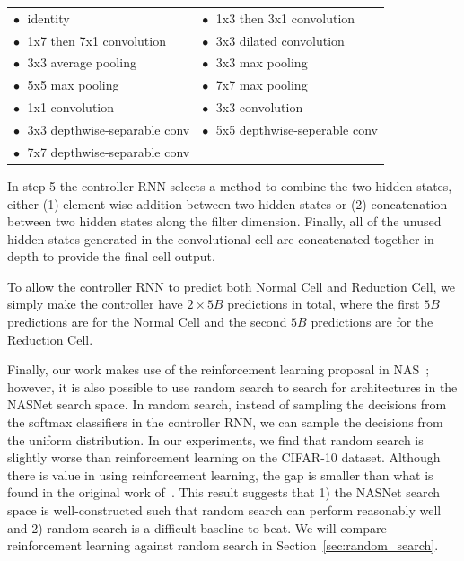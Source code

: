 \begin{table}[H]
\footnotesize
\setlength{\tabcolsep}{0.5em} %
\centering
\def\arraystretch{1.0}
\begin{tabular}{ll}
$\bullet\;$ identity & $\bullet\;$ 1x3 then 3x1 convolution \\
$\bullet\;$ 1x7 then 7x1 convolution & $\bullet\;$ 3x3 dilated convolution \\
$\bullet\;$ 3x3 average pooling & $\bullet\;$ 3x3 max pooling \\
$\bullet\;$ 5x5 max pooling & $\bullet\;$ 7x7 max pooling \\
$\bullet\;$ 1x1 convolution & $\bullet\;$ 3x3 convolution \\
$\bullet\;$ 3x3 depthwise-separable conv & $\bullet\;$ 5x5 depthwise-seperable conv \\
$\bullet\;$ 7x7 depthwise-separable conv \\
\end{tabular}
\end{table}

In step 5 the controller RNN selects a method to combine the two hidden states, either (1) element-wise addition between two hidden states or (2) concatenation between two hidden states along the filter dimension.
Finally, all of the unused hidden states generated in the convolutional cell are concatenated together in depth to provide the final cell output.


To allow the controller RNN to predict both Normal Cell and Reduction Cell, we simply make the controller have $2\times 5B$ predictions in total, where the first $5B$ predictions are for the Normal Cell and the second $5B$ predictions are for the Reduction Cell.

Finally, our work makes use of the reinforcement learning proposal in NAS~\cite{zoph2017neural}; however, it is also possible to use random search to search for architectures in the NASNet search space. In random search, instead of sampling the decisions from the softmax classifiers in the controller RNN, we can sample the decisions from the uniform distribution. In our experiments, we find that random search is slightly worse than reinforcement learning on the CIFAR-10 dataset. Although there is value in using reinforcement learning, the gap is smaller than what is found in the original work of~\cite{zoph2017neural}. This result suggests that 1) the NASNet search space is  well-constructed such that random search can perform reasonably well and 2) random search is a difficult baseline to beat. We will compare reinforcement learning against random search in Section~\ref{sec:random_search}.



